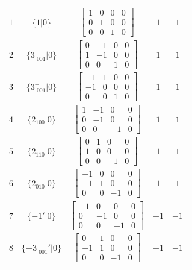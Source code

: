 \documentclass[fleqn,8pt]{jsarticle}
\begin{document}
\begin{longtable}{ccccc}
$ 1 $ & $ \{1|0\} $ & $ \begin{bmatrix} 1 & 0 & 0 & 0 \\ 0 & 1 & 0 & 0 \\ 0 & 0 & 1 & 0 \end{bmatrix} $ & $ 1 $ & $ 1 $ \\ \hline
$ 2 $ & $ \{3^{+}_{\,\,001}|0\} $ & $ \begin{bmatrix} 0 & -1 & 0 & 0 \\ 1 & -1 & 0 & 0 \\ 0 & 0 & 1 & 0 \end{bmatrix} $ & $ 1 $ & $ 1 $ \\ \hline
$ 3 $ & $ \{3^{-}_{\,\,001}|0\} $ & $ \begin{bmatrix} -1 & 1 & 0 & 0 \\ -1 & 0 & 0 & 0 \\ 0 & 0 & 1 & 0 \end{bmatrix} $ & $ 1 $ & $ 1 $ \\ \hline
$ 4 $ & $ \{2{}_{100}|0\} $ & $ \begin{bmatrix} 1 & -1 & 0 & 0 \\ 0 & -1 & 0 & 0 \\ 0 & 0 & -1 & 0 \end{bmatrix} $ & $ 1 $ & $ 1 $ \\ \hline
$ 5 $ & $ \{2{}_{110}|0\} $ & $ \begin{bmatrix} 0 & 1 & 0 & 0 \\ 1 & 0 & 0 & 0 \\ 0 & 0 & -1 & 0 \end{bmatrix} $ & $ 1 $ & $ 1 $ \\ \hline
$ 6 $ & $ \{2{}_{010}|0\} $ & $ \begin{bmatrix} -1 & 0 & 0 & 0 \\ -1 & 1 & 0 & 0 \\ 0 & 0 & -1 & 0 \end{bmatrix} $ & $ 1 $ & $ 1 $ \\ \hline
$ 7 $ & $ \{-1{}'|0\} $ & $ \begin{bmatrix} -1 & 0 & 0 & 0 \\ 0 & -1 & 0 & 0 \\ 0 & 0 & -1 & 0 \end{bmatrix} $ & $ -1 $ & $ -1 $ \\ \hline
$ 8 $ & $ \{-3^{+}_{\,\,001}{}'|0\} $ & $ \begin{bmatrix} 0 & 1 & 0 & 0 \\ -1 & 1 & 0 & 0 \\ 0 & 0 & -1 & 0 \end{bmatrix} $ & $ -1 $ & $ -1 $ \\ \hline

\end{longtable}
\end{document}
